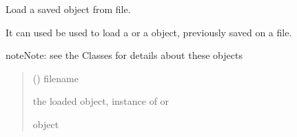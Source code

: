 \documentclass[letterpaper,10pt,english]{sphinxmanual}
\begin{document}
\begin{fulllineitems}
\label{\detokenize{cubmods:cubmods.general.load_object}}
\pysigstartsignatures
{}
\pysigstopsignatures
\sphinxAtStartPar
Load a saved object from file.

\sphinxAtStartPar
It can used be used to load a  or a
 object, previously saved on a file.

\begin{sphinxadmonition}{note}{Note:}
\sphinxAtStartPar
see the Classes for details about these objects
\end{sphinxadmonition}
\begin{quote}\begin{description}
\sphinxAtStartPar
{} () \textendash{} filename

\sphinxAtStartPar
the loaded object, instance of  or 

\sphinxAtStartPar
object

\end{description}\end{quote}

\end{fulllineitems}

\end{document}
